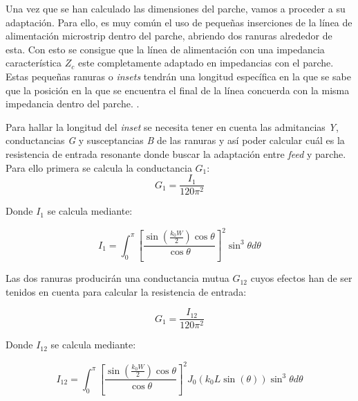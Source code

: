 \par Una vez que se han calculado las dimensiones del parche, vamos a proceder a su adaptación. Para ello, es muy común el uso de pequeñas inserciones de la línea de alimentación microstrip dentro del parche, abriendo dos ranuras alrededor de esta. Con esto se consigue que la línea de alimentación con una impedancia característica $Z_{c}$ este completamente adaptado en impedancias con el parche. Estas pequeñas ranuras o \textit{insets} tendrán una longitud específica en la que se sabe que la posición en la que se encuentra el final de la línea concuerda con la misma impedancia dentro del parche. .
\\
\par Para hallar la longitud del \textit{inset} se necesita tener en cuenta las admitancias \textit{Y}, conductancias \textit{G} y susceptancias \textit{B} de las ranuras y así poder calcular cuál es la resistencia de entrada resonante donde buscar la adaptación entre \textit{feed} y parche. Para ello primera se calcula la conductancia \textit{$G_{1}$}:
\\
\begin{equation}
	G_{1}=\frac{I_{1}}{120\pi^{2}}
	\label{eq:g1}
\end{equation}

\par Donde \textit{$I_{1}$} se calcula mediante:

\begin{equation}
	I_{1}=\int_{0}^{\pi}\left [ \frac{\sin(\frac{k_{0}W}{2})\cos\theta } {\cos\theta} \right ]^{2}\sin^{3}\theta d\theta
	\label{eq:I1}
\end{equation}

\par Las dos ranuras  producirán una conductancia mutua \textit{$G_{12}$} cuyos efectos han de ser tenidos en cuenta para calcular la resistencia de entrada:

\begin{equation}
	G_{1}=\frac{I_{12}}{120\pi^{2}}
	\label{eq:g12}
\end{equation}

\par Donde \textit{$I_{12}$} se calcula mediante:

\begin{equation}
	I_{12}=\int_{0}^{\pi}\left [ \frac{\sin(\frac{k_{0}W}{2})\cos\theta } {\cos\theta} \right ]^{2} J_{0}(k_{0}L\sin(\theta)) 
 \sin^{3}\theta d\theta
	\label{eq:I12}
\end{equation}

